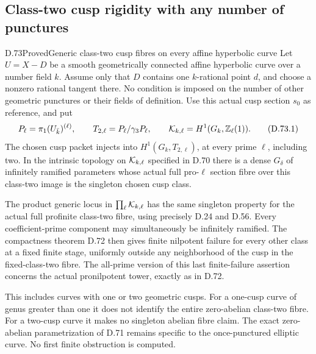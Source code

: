 \subsection{Class-two cusp rigidity with any number of punctures}

\begin{statement}{D.73}{Proved}{Generic class-two cusp fibres on every affine hyperbolic curve}
Let \(U=X-D\) be a smooth geometrically connected affine
hyperbolic curve over a number field \(k\). Assume only that
\(D\) contains one \(k\)-rational point \(d\), and choose a
nonzero rational tangent there. No condition is imposed on
the number of other geometric punctures or their fields of
definition. Use this actual cusp section \(s_0\) as reference,
and put
\[
 P_\ell=\pi_1(U_{\bar k})^{(\ell)},\qquad
 T_{2,\ell}=P_\ell/\gamma_3P_\ell,\qquad
 {\cal K}_{k,\ell}=H^1(G_k,\mathbb Z_\ell(1)).
                                                        \tag{D.73.1}
\]
The chosen cusp packet injects into
\(H^1(G_k,T_{2,\ell})\), at every prime \(\ell\), including
two. In the intrinsic topology on \({\cal K}_{k,\ell}\)
specified in D.70 there is a dense \(G_\delta\) of
infinitely ramified parameters whose actual full pro-\(\ell\)
section fibre over this class-two image is the singleton
chosen cusp class.

The product generic locus in
\(\prod_\ell{\cal K}_{k,\ell}\) has the same singleton
property for the actual full profinite class-two fibre,
using precisely D.24 and D.56. Every coefficient-prime
component may simultaneously be infinitely ramified.
The compactness theorem D.72 then gives finite nilpotent
failure for every other class at a fixed finite stage,
uniformly outside any neighborhood of the cusp in the
fixed-class-two fibre. The all-prime version of this
last finite-failure assertion concerns the actual
pronilpotent tower, exactly as in D.72.

This includes curves with one or two geometric cusps.
For a one-cusp curve of genus greater than one it does
not identify the entire zero-abelian class-two fibre.
For a two-cusp curve it makes no singleton abelian
fibre claim. The exact zero-abelian parametrization
of D.71 remains specific to the once-punctured elliptic
curve. No first finite obstruction is computed.
\end{statement}

